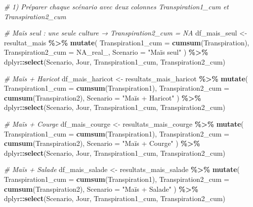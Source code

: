 \documentclass[
]{article}
\newenvironment{Shaded}{\begin{snugshade}}{\end{snugshade}}
\newcommand{\AttributeTok}[1]{\textcolor[rgb]{0.13,0.29,0.53}{#1}}
\newcommand{\CommentTok}[1]{\textcolor[rgb]{0.56,0.35,0.01}{\textit{#1}}}
\newcommand{\ConstantTok}[1]{\textcolor[rgb]{0.56,0.35,0.01}{#1}}
\newcommand{\FunctionTok}[1]{\textcolor[rgb]{0.13,0.29,0.53}{\textbf{#1}}}
\newcommand{\NormalTok}[1]{#1}
\newcommand{\OtherTok}[1]{\textcolor[rgb]{0.56,0.35,0.01}{#1}}
\newcommand{\SpecialCharTok}[1]{\textcolor[rgb]{0.81,0.36,0.00}{\textbf{#1}}}
\newcommand{\StringTok}[1]{\textcolor[rgb]{0.31,0.60,0.02}{#1}}
\begin{document}
\begin{Shaded}
\begin{Highlighting}[]
\CommentTok{\# 1) Préparer chaque scénario avec deux colonnes Transpiration1\_cum et Transpiration2\_cum}

\CommentTok{\#   Maïs seul : une seule culture → Transpiration2\_cum = NA}
\NormalTok{df\_mais\_seul }\OtherTok{\textless{}{-}}\NormalTok{ resultat\_mais }\SpecialCharTok{\%\textgreater{}\%}
  \FunctionTok{mutate}\NormalTok{(}
    \AttributeTok{Transpiration1\_cum =} \FunctionTok{cumsum}\NormalTok{(Transpiration),}
    \AttributeTok{Transpiration2\_cum =} \ConstantTok{NA\_real\_}\NormalTok{,}
    \AttributeTok{Scenario =} \StringTok{"Maïs seul"}
\NormalTok{  ) }\SpecialCharTok{\%\textgreater{}\%}
\NormalTok{  dplyr}\SpecialCharTok{::}\FunctionTok{select}\NormalTok{(Scenario, Jour, Transpiration1\_cum, Transpiration2\_cum)}

\CommentTok{\#   Maïs + Haricot}
\NormalTok{df\_mais\_haricot }\OtherTok{\textless{}{-}}\NormalTok{ resultats\_mais\_haricot }\SpecialCharTok{\%\textgreater{}\%}
  \FunctionTok{mutate}\NormalTok{(}
    \AttributeTok{Transpiration1\_cum =} \FunctionTok{cumsum}\NormalTok{(Transpiration1),}
    \AttributeTok{Transpiration2\_cum =} \FunctionTok{cumsum}\NormalTok{(Transpiration2),}
    \AttributeTok{Scenario =} \StringTok{"Maïs + Haricot"}
\NormalTok{  ) }\SpecialCharTok{\%\textgreater{}\%}
\NormalTok{  dplyr}\SpecialCharTok{::}\FunctionTok{select}\NormalTok{(Scenario, Jour, Transpiration1\_cum, Transpiration2\_cum)}

\CommentTok{\#   Maïs + Courge}
\NormalTok{df\_mais\_courge }\OtherTok{\textless{}{-}}\NormalTok{ resultats\_mais\_courge }\SpecialCharTok{\%\textgreater{}\%}
  \FunctionTok{mutate}\NormalTok{(}
    \AttributeTok{Transpiration1\_cum =} \FunctionTok{cumsum}\NormalTok{(Transpiration1),}
    \AttributeTok{Transpiration2\_cum =} \FunctionTok{cumsum}\NormalTok{(Transpiration2),}
    \AttributeTok{Scenario =} \StringTok{"Maïs + Courge"}
\NormalTok{  ) }\SpecialCharTok{\%\textgreater{}\%}
\NormalTok{  dplyr}\SpecialCharTok{::}\FunctionTok{select}\NormalTok{(Scenario, Jour, Transpiration1\_cum, Transpiration2\_cum)}

\CommentTok{\#   Maïs + Salade}
\NormalTok{df\_mais\_salade }\OtherTok{\textless{}{-}}\NormalTok{ resultats\_mais\_salade }\SpecialCharTok{\%\textgreater{}\%}
  \FunctionTok{mutate}\NormalTok{(}
    \AttributeTok{Transpiration1\_cum =} \FunctionTok{cumsum}\NormalTok{(Transpiration1),}
    \AttributeTok{Transpiration2\_cum =} \FunctionTok{cumsum}\NormalTok{(Transpiration2),}
    \AttributeTok{Scenario =} \StringTok{"Maïs + Salade"}
\NormalTok{  ) }\SpecialCharTok{\%\textgreater{}\%}
\NormalTok{  dplyr}\SpecialCharTok{::}\FunctionTok{select}\NormalTok{(Scenario, Jour, Transpiration1\_cum, Transpiration2\_cum)}


\end{Highlighting}
\end{Shaded}
\end{document}
